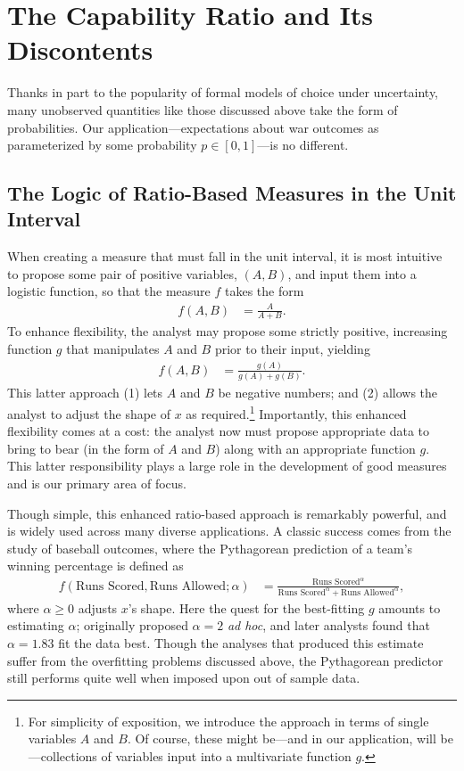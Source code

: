 \section{The Capability Ratio and Its Discontents}
Thanks in part to the popularity of formal models of choice under uncertainty, many unobserved quantities like those discussed above take the form of probabilities.  Our application---expectations about war outcomes as parameterized by some probability $p \in [0,1]$---is no different.

\subsection{The Logic of Ratio-Based Measures in the Unit Interval}
When creating a measure that must fall in the unit interval, it is most intuitive to propose some pair of positive variables, $(A,B)$, and input them into a logistic function, so that the measure $f$ takes the form
\begin{align*}
  f(A,B) &= \frac{A}{A + B}.
\end{align*}
To enhance flexibility, the analyst may propose some strictly positive, increasing function $g$ that manipulates $A$ and $B$ prior to their input, yielding
\begin{align*}
  f(A,B) &= \frac{g(A)}{g(A) + g(B)}.
\end{align*}
This latter approach (1) lets $A$ and $B$ be negative numbers; and (2) allows the analyst to adjust the shape of $x$ as required.\footnote{For simplicity of exposition, we introduce the approach in terms of single variables $A$ and $B$.  Of course, these might be---and in our application, will be---collections of variables input into a multivariate function $g$.}  Importantly, this enhanced flexibility comes at a cost:  the analyst now must propose appropriate data to bring to bear (in the form of $A$ and $B$) along with an appropriate function $g$.  This latter responsibility plays a large role in the development of good measures and is our primary area of focus.

Though simple, this enhanced ratio-based approach is remarkably powerful, and is widely used across many diverse applications.  A classic success comes from the study of baseball outcomes, where the Pythagorean prediction \citep{james1983,miller2007} of a team's winning percentage is defined as
\begin{align*}
  f\left(\text{Runs Scored}, \text{Runs Allowed} ; \alpha\right) &= \frac{\text{Runs Scored}^\alpha}{\text{Runs Scored}^\alpha + \text{Runs Allowed}^\alpha},
\end{align*}
where $\alpha \geq 0$ adjusts $x$'s shape.  Here the quest for the best-fitting $g$ amounts to estimating $\alpha$; \citet{james1983} originally proposed $\alpha = 2$ \emph{ad hoc}, and later analysts found that $\alpha = 1.83$ fit the data best.  Though the analyses that produced this estimate suffer from the overfitting problems discussed above, the Pythagorean predictor still performs quite well when imposed upon out of sample data.


